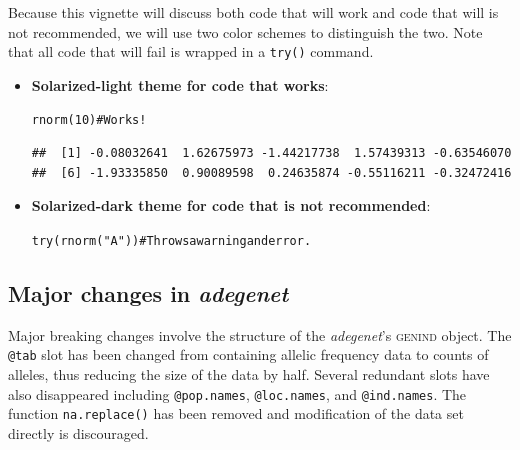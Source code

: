 \documentclass[letterpaper]{article}\usepackage[]{graphicx}\usepackage[]{color}
\makeatletter
\newcommand{\hlnum}[1]{\textcolor[rgb]{0.863,0.196,0.184}{#1}}%
\newcommand{\hlstr}[1]{\textcolor[rgb]{0.863,0.196,0.184}{#1}}%
\newcommand{\hlcom}[1]{\textcolor[rgb]{0.576,0.631,0.631}{#1}}%
\newcommand{\hlstd}[1]{\textcolor[rgb]{0.396,0.482,0.514}{#1}}%
\newcommand{\hlkwd}[1]{\textcolor[rgb]{0.345,0.431,0.459}{#1}}%
\newenvironment{kframe}{%
 \def\at@end@of@kframe{}%
 \ifinner\ifhmode%
  \def\at@end@of@kframe{\end{minipage}}%
  \begin{minipage}{\columnwidth}%
 \fi\fi%
 \def\FrameCommand##1{\hskip\@totalleftmargin \hskip-\fboxsep
 \colorbox{shadecolor}{##1}\hskip-\fboxsep
     \hskip-\linewidth \hskip-\@totalleftmargin \hskip\columnwidth}%
 \MakeFramed {\advance\hsize-\width
   \@totalleftmargin\z@ \linewidth\hsize
   \@setminipage}}%
 {\par\unskip\endMakeFramed%
 \at@end@of@kframe}
\newenvironment{knitrout}{}{} %
\newcommand{\adegenet}{\textit{adegenet}}
\makeatother
\begin{document}
Because this vignette will discuss both code that will work and code that will
is not recommended, we will use two color schemes to distinguish the two. Note
that all code that will fail is wrapped in a \texttt{try()} command.
\begin{itemize}
\item \textbf{Solarized-light theme for code that works}:
\begin{knitrout}
\color{fgcolor}\begin{kframe}
\begin{alltt}
\hlkwd{rnorm}\hlstd{(}\hlnum{10}\hlstd{)} \hlcom{# Works!}
\end{alltt}
\begin{verbatim}
##  [1] -0.08032641  1.62675973 -1.44217738  1.57439313 -0.63546070
##  [6] -1.93335850  0.90089598  0.24635874 -0.55116211 -0.32472416
\end{verbatim}
\end{kframe}
\end{knitrout}



\item \textbf{Solarized-dark theme for code that is not recommended}:
\begin{knitrout}
\color{fgcolor}\begin{kframe}
\begin{alltt}
\hlkwd{try}\hlstd{(}\hlkwd{rnorm}\hlstd{(}\hlstr{"A"}\hlstd{))} \hlcom{# Throws a warning and error.}
\end{alltt}


{\ttfamily\noindent{}}\end{kframe}
\end{knitrout}


\end{itemize}
\subsection{Major changes in \adegenet{}}

Major breaking changes involve the structure of the \adegenet{}'s \textsc{genind}
object. The \texttt{@tab} slot has been changed from containing allelic frequency
data to counts of alleles, thus reducing the size of the data by half. Several
redundant slots have also disappeared including \texttt{@pop.names}, 
\texttt{@loc.names}, and \texttt{@ind.names}. The function \texttt{na.replace()}
has been removed and modification of the data set directly is discouraged. 
\end{document}
